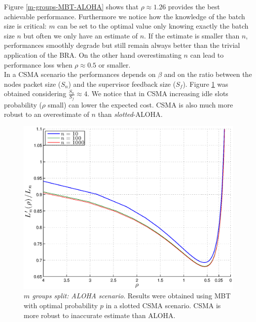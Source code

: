\documentclass[12pt,a4paper]{report}
\begin{document}
Figure \ref{m-groups-MBT-ALOHA} shows that  $\rho\approx 1.26$ provides the best achievable performance. Furthermore we notice how the knowledge of the batch size is critical: $m$ can be set to the optimal value only knowing exactly the batch size $n$ but often we only have an estimate of $n$. If the estimate is smaller than $n$, performances smoothly degrade but still remain always better than the trivial application of the BRA. On the other hand overestimating $n$ can lead to performance loss when $\rho \approx 0.5$ or smaller.\\

In a CSMA scenario the performances depends on $\beta$ and on the ratio between the nodes packet size ($S_{n}$) and the supervisor feedback size ($S_{f}$). Figure \ref{m-groups-MBT-CSMA} was obtained considering $\displaystyle\frac{S_{n}}{S_{f}}\approx4$. We notice that in CSMA increasing idle slots probability ($\rho$ small) can lower the expected cost. CSMA is also much more robust to an overestimate of $n$ than \emph{slotted}-ALOHA.

\begin{figure}[H]
\begin{center}
\includegraphics[scale=0.7]{matlab/BTs/m-groups-MBT-CSMA}
\caption[$m$ groups split: CSMA scenario]{\emph{$m$ groups split: ALOHA scenario}. Results were obtained using MBT with optimal probability $p$ in a slotted CSMA scenario. CSMA is more robust to inaccurate estimate than ALOHA.}
\label{m-groups-MBT-CSMA}
\end{center}
\end{figure}
\end{document}
